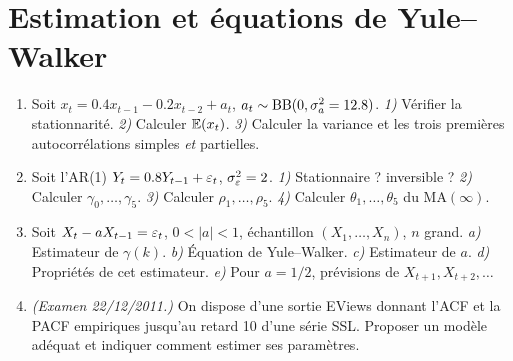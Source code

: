 \documentclass[11pt]{article}
\begin{document}
\section{Estimation et équations de Yule--Walker}
\begin{enumerate}[label=\textbf{Q\,G.\arabic*},leftmargin=*]
\item Soit $x_t=0.4x_{t-1}-0.2x_{t-2}+a_t$, $a_t\sim\operatorname{BB}(0,\sigma_a^2=12.8)$.
\emph{1)} Vérifier la stationnarité. \emph{2)} Calculer $\mathbb{E}(x_t)$. \emph{3)} Calculer la
variance et les trois premières autocorrélations simples \emph{et} partielles.

\item Soit l'AR(1) $Y_t=0.8Y_{t-1}+\varepsilon_t$, $\sigma_\varepsilon^2=2$.
\emph{1)} Stationnaire ? inversible ? \emph{2)} Calculer $\gamma_0,\dots,\gamma_5$.
\emph{3)} Calculer $\rho_1,\dots,\rho_5$. \emph{4)} Calculer $\theta_1,\dots,\theta_5$ du
$\mathrm{MA}(\infty)$.

\item Soit $X_t-aX_{t-1}=\varepsilon_t$, $0<|a|<1$, échantillon $(X_1,\dots,X_n)$, $n$ grand.
\emph{a)} Estimateur de $\gamma(k)$. \emph{b)} Équation de Yule--Walker. \emph{c)} Estimateur
de $a$. \emph{d)} Propriétés de cet estimateur. \emph{e)} Pour $a=1/2$, prévisions de
$X_{t+1},X_{t+2},\dots$

\item \emph{(Examen 22/12/2011.)} On dispose d'une sortie EViews donnant l'ACF et la PACF
empiriques jusqu'au retard 10 d'une série SSL. Proposer un modèle adéquat et indiquer comment
estimer ses paramètres.
\end{enumerate}

\end{document}
